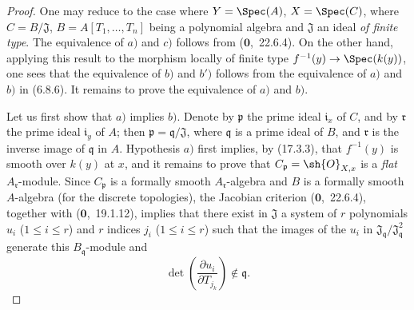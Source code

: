 \begin{proof}
One may reduce to the case where $Y=\Spec(A)$, $X=\Spec(C)$, where $C=B/\mathfrak{J}$, $B=A[T_1,\ldots,T_n]$ being a polynomial algebra and $\mathfrak{J}$ an ideal \emph{of finite type}.
The equivalence of $a)$ and $c)$ follows from ($\mathbf{0}$,~22.6.4).
On the other hand, applying this result to the morphism locally of finite type $f^{-1}(y)\to\Spec(k(y))$, one sees that the equivalence of $b)$ and $b')$ follows from the equivalence of $a)$ and $b)$ in (6.8.6).
It remains to prove the equivalence of $a)$ and $b)$.

Let us first show that $a)$ implies $b)$.
Denote by $\mathfrak{p}$ the prime ideal $\mathfrak{i}_x$ of $C$, and by $\mathfrak{r}$ the prime ideal $\mathfrak{i}_y$ of $A$; then $\mathfrak{p}=\mathfrak{q}/\mathfrak{J}$, where $\mathfrak{q}$ is a prime ideal of $B$, and $\mathfrak{r}$ is the inverse image of $\mathfrak{q}$ in $A$.
Hypothesis $a)$ first implies, by (17.3.3), that $f^{-1}(y)$ is smooth over $k(y)$ at $x$, and it remains to prove that $C_\mathfrak{p}=\sh{O}_{X,x}$ is a \emph{flat} $A_\mathfrak{r}$-module.
Since $C_\mathfrak{p}$ is a formally smooth $A_\mathfrak{r}$-algebra and $B$ is a formally smooth $A$-algebra (for the discrete topologies), the Jacobian criterion ($\mathbf{0}$,~22.6.4), together with ($\mathbf{0}$,~19.1.12), implies that there exist in $\mathfrak{J}$ a system of $r$ polynomials $u_i$ ($1\leqslant i\leqslant r$) and $r$ indices $j_i$ ($1\leqslant i\leqslant r$) such that the images of the $u_i$ in $\mathfrak{J}_\mathfrak{q}/\mathfrak{J}_\mathfrak{q}^2$ generate this $B_\mathfrak{q}$-module and
\[
\tag{17.5.1.1}
\det\left(\frac{\partial u_i}{\partial T_{j_k}}\right)\notin\mathfrak{q}.
\]



\end{proof}
